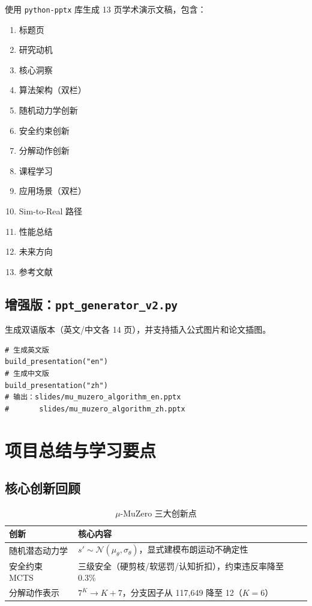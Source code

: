 \documentclass[UTF8, a4paper]{ctexart}
\begin{document}
使用 \texttt{python-pptx} 库生成 13 页学术演示文稿，包含：
\begin{enumerate}[leftmargin=2em]
    \item 标题页
    \item 研究动机
    \item 核心洞察
    \item 算法架构（双栏）
    \item 随机动力学创新
    \item 安全约束创新
    \item 分解动作创新
    \item 课程学习
    \item 应用场景（双栏）
    \item Sim-to-Real 路径
    \item 性能总结
    \item 未来方向
    \item 参考文献
\end{enumerate}

\subsection{增强版：\texttt{ppt\_generator\_v2.py}}

生成双语版本（英文/中文各 14 页），并支持插入公式图片和论文插图。

\begin{lstlisting}
# 生成英文版
build_presentation("en")
# 生成中文版
build_presentation("zh")
# 输出：slides/mu_muzero_algorithm_en.pptx
#       slides/mu_muzero_algorithm_zh.pptx
\end{lstlisting}

\newpage
\section{项目总结与学习要点}

\subsection{核心创新回顾}

\begin{table}[H]
\centering
\caption{$\mu$-MuZero 三大创新点}
\begin{tabular}{@{}lp{8cm}@{}}
\toprule
\textbf{创新} & \textbf{核心内容} \\
\midrule
随机潜态动力学 & $s' \sim \mathcal{N}(\mu_\theta, \sigma_\theta)$，显式建模布朗运动不确定性 \\
安全约束 MCTS & 三级安全（硬剪枝/软惩罚/认知折扣），约束违反率降至 0.3\% \\
分解动作表示 & $7^K \to K + 7$，分支因子从 117,649 降至 12（$K=6$） \\
\bottomrule
\end{tabular}
\end{table}
\end{document}
